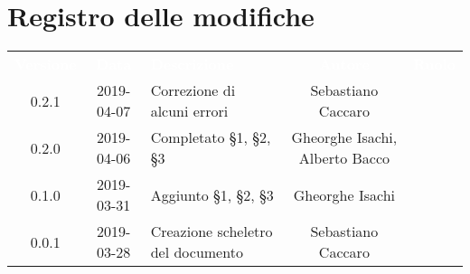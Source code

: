 \section*{Registro delle modifiche}
{
	\renewcommand{\arraystretch}{1.5}
	\centering
	\begin{longtable}{ c c C{6cm} c c }
		\textcolor{white}{\textbf{Versione}} & \textcolor{white}{\textbf{Data}} & \textcolor{white}{\textbf{Descrizione}} & \textcolor{white}{\textbf{Autore}} & \textcolor{white}{\textbf{Ruolo}}\\
			
		0.2.1 & 2019-04-07 & Correzione di alcuni errori & Sebastiano Caccaro & \reda{} \\ 

		0.2.0 & 2019-04-06 & Completato \S1, \S2, \S3 & Gheorghe Isachi, Alberto Bacco & \reda{} \\
		
		0.1.0 & 2019-03-31 & Aggiunto \S1, \S2, \S3 & Gheorghe Isachi & \reda{} \\
		
		0.0.1 & 2019-03-28 & Creazione scheletro del documento & Sebastiano Caccaro & \reda{}
		
	\end{longtable}

}